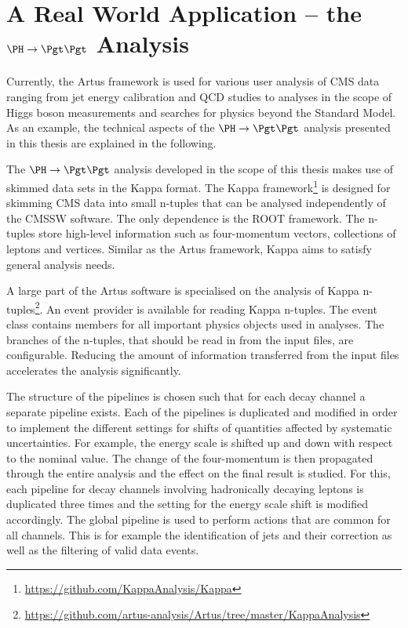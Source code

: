 \documentclass[3p]{elsarticle}
\begin{document}
\section{A Real World Application -- the $\PH\to\Pgt\Pgt$ Analysis \label{section_artus_example_htt}}

Currently, the Artus framework is used for various user analysis of CMS data ranging from jet energy calibration and QCD studies to analyses in the scope of Higgs boson measurements and searches for physics beyond the Standard Model. As an example, the technical aspects of the $\PH\to\Pgt\Pgt$ analysis presented in this thesis are explained in the following.

The $\PH\to\Pgt\Pgt$ analysis developed in the scope of this thesis makes use of skimmed data sets in the Kappa format. The Kappa framework\footnote{\url{https://github.com/KappaAnalysis/Kappa}} is designed for skimming CMS data into small n-tuples that can be analysed independently of the CMSSW software. The only dependence is the ROOT framework. The n-tuples store high-level information such as four-momentum vectors, collections of leptons and vertices. Similar as the Artus framework, Kappa aims to satisfy general analysis needs.

A large part of the Artus software is specialised on the analysis of Kappa n-tuples\footnote{\url{https://github.com/artus-analysis/Artus/tree/master/KappaAnalysis}}. An event provider is available for reading Kappa n-tuples. The event class contains members for all important physics objects used in analyses. The branches of the n-tuples, that should be read in from the input files, are configurable. Reducing the amount of information transferred from the input files accelerates the analysis significantly.

The structure of the pipelines is chosen such that for each decay channel a separate pipeline exists. Each of the pipelines is duplicated and modified in order to implement the different settings for shifts of quantities affected by systematic uncertainties. For example, the \Pgt energy scale is shifted up and down with respect to the nominal value. The change of the \Pgt four-momentum is then propagated through the entire analysis and the effect on the final result is studied. For this, each pipeline for decay channels involving hadronically decaying \Pgt leptons is duplicated three times and the setting for the \Pgt energy scale shift is modified accordingly. The global pipeline is used to perform actions that are common for all channels. This is for example the identification of jets and their correction as well as the filtering of valid data events.
\end{document}
